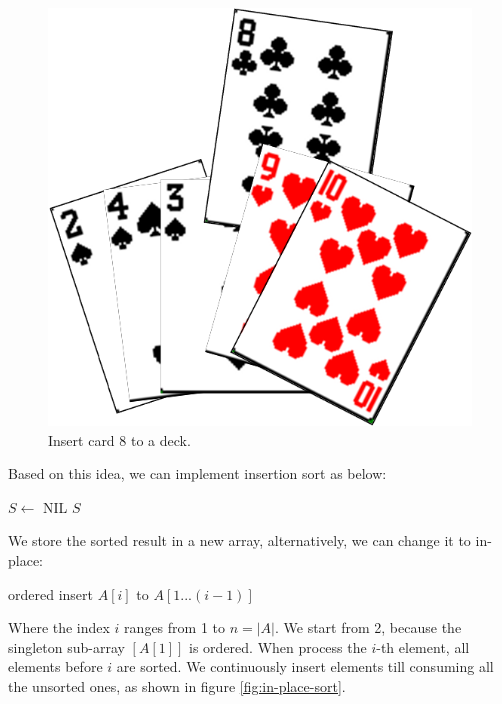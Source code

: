 \documentclass[b5paper]{article}
\begin{document}
\begin{figure}[htbp]
  \centering
  \includegraphics[scale=0.5]{img/card-deck.png}
  \caption{Insert card 8 to a deck.}
  \label{fig:hand-of-cards}
\end{figure}

Based on this idea, we can implement insertion sort as below:

\begin{algorithmic}[1]
  \State $S \gets$ NIL
    \State {}
  \EndFor
  \State \Return $S$
\EndFunction
\end{algorithmic}

We store the sorted result in a new array, alternatively, we can change it to in-place:

\begin{algorithmic}[1]
    \State ordered insert $A[i]$ to $A[1...(i-1)]$
  \EndFor
\EndFunction
\end{algorithmic}

Where the index $i$ ranges from 1 to $n = |A|$. We start from 2, because the singleton sub-array $[A[1]]$ is ordered. When process the $i$-th element, all elements before $i$ are sorted. We continuously insert elements till consuming all the unsorted ones, as shown in figure \ref{fig:in-place-sort}.
\end{document}
